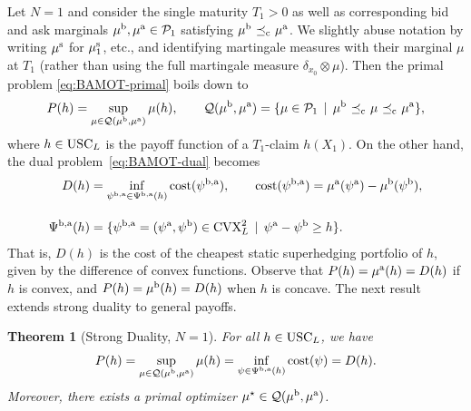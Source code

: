 \documentclass[11pt]{article}
\newcommand{\cP}{\mathcal{P}}
\newcommand{\cQ}{\mathcal{Q}}
\theoremstyle{plain}
\newtheorem{theorem}{Theorem}[section]
\theoremstyle{definition}
\theoremstyle{remark}
\DeclareMathOperator{\cleq}{\,\preceq_{\rm c}\,}
\theoremstyle{plain}
\begin{document}
Let $N=1$ and consider the single maturity $T_1>0$ as well as corresponding bid and ask marginals $\mu^{\rm{b}}, \mu^{\rm{a}} \in \cP_1$ satisfying $\mu^{\rm{b}} \cleq \mu^{\rm{a}}$.
%
%
We slightly abuse notation by writing $\mu^{\rm s}$ for $\mu^{\rm s}_1$, etc., and identifying martingale measures with their marginal $\mu$ at $T_1$ (rather than using the full martingale measure $\delta_{x_0}\otimes \mu$).
%
%
%
Then the primal problem \eqref{eq:BAMOT-primal} boils down to %
%
%
%
%
\begin{equation}\label{eq:primal1M}
P(h) = \sup_{\mu \in  \cQ(\mu^{\rm{b}}, \mu^{\rm{a}})}\mu(h), \qquad 
    \cQ(\mu^{\rm{b}}, \mu^{\rm{a}}) = \{\mu \in \cP_1 \, \mid \, \mu^{\rm{b}} \cleq \mu \cleq  \mu^{\rm{a}} \}, 
\end{equation}
where $h\in \textnormal{USC}_L $ is the payoff function of a $T_1$-claim $h(X_1)$. 
%
%
%
%
%
On the other hand, the dual problem~\eqref{eq:BAMOT-dual} becomes 
\begin{align*}
  D(h) &= \inf_{\psi^{\rm b,a} \in \Psi^{\rm b,a}(h)} \text{cost}(\psi^{\rm b,a}), \qquad 
 \text{cost}(\psi^{\rm b,a}) = \mu^{\rm{a}}(\psi^{\rm a}) - \mu^{\rm{b}}(\psi^{\rm b}), \label{eq:DualOneMat}\\[1em]
  \Psi^{\rm b,a}(h)  &=   \{ \psi^{\rm b,a}  = (\psi^{\rm a},\psi^{\rm b})\in \text{CVX}_L^2 \,\mid \, \psi^{\rm a} - \psi^{\rm b} \geq h\}. \nonumber
\end{align*}
%
That is, $D(h)$ is the cost of the cheapest static superhedging portfolio of $h$, given by the difference of convex functions. Observe that $P(h) = \mu^{\rm a}(h) = D(h)$ if $h$ is convex, and $P(h) = \mu^{\rm b}(h) = D(h)$ when $h$ is concave. The next result extends strong duality to general payoffs. 

\begin{theorem}[Strong Duality,  $N=1$]\label{thm:band-duality}
For all $h \in \textnormal{USC}_{L}$, we have
$$P(h) = \sup_{\mu \in \cQ(\mu^{\rm b}, \mu^{\rm a})} \mu(h) = 
\inf_{\psi \in \Psi^{\rm{b,a}}(h)} \textnormal{cost}(\psi) =  D(h).
$$
%
Moreover, there exists a primal optimizer $\mu^{\star}\in \cQ(\mu^{\rm b}, \mu^{\rm a})$. 
\end{theorem}
%
%
%
%
%
%
\end{document}

